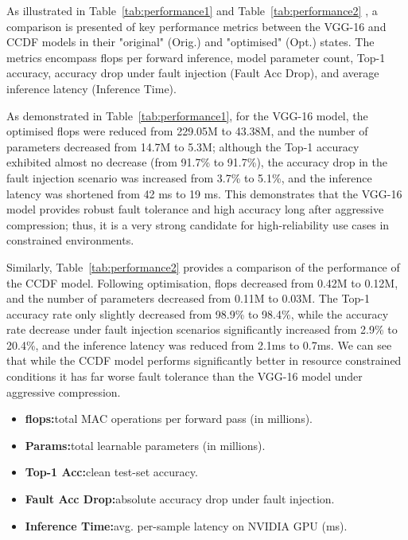     As illustrated in Table~\ref{tab:performance1} and Table~\ref{tab:performance2} , a comparison is presented of key performance metrics between the VGG-16 and CCDF models in their "original" (Orig.) and "optimised" (Opt.) states. The metrics encompass \gls{flops} per forward inference, model parameter count, Top-1 accuracy, accuracy drop under fault injection (Fault Acc Drop), and average inference latency (Inference Time).
    
    As demonstrated in Table~\ref{tab:performance1}, for the VGG-16 model, the optimised \gls{flops} were reduced from 229.05M to 43.38M, and the number of parameters decreased from 14.7M to 5.3M; although the Top-1 accuracy exhibited almost no decrease (from 91.7\% to 91.7\%), the accuracy drop in the fault injection scenario was increased from 3.7\% to 5.1\%, and the inference latency was shortened from 42 ms to 19 ms. This demonstrates that the VGG-16 model provides robust fault tolerance and high accuracy long after aggressive compression; thus, it is a very strong candidate for high-reliability use cases in constrained environments.
    
    Similarly, Table~\ref{tab:performance2} provides a comparison of the performance of the CCDF model. Following optimisation, \gls{flops} decreased from 0.42M to 0.12M, and the number of parameters decreased from 0.11M to 0.03M. The Top-1 accuracy rate only slightly decreased from 98.9\% to 98.4\%, while the accuracy rate decrease under fault injection scenarios significantly increased from 2.9\% to 20.4\%, and the inference latency was reduced from 2.1ms to 0.7ms. We can see that while the CCDF model performs significantly better in resource constrained conditions it has far worse fault tolerance than the VGG-16 model under aggressive compression.
    
    \begin{itemize}
        \item \textbf{\gls{flops}:}total MAC operations per forward pass (in millions).
        \item \textbf{Params:}total learnable parameters (in millions).
        \item \textbf{Top-1 Acc:}clean test-set accuracy.
        \item \textbf{Fault Acc Drop:}absolute accuracy drop under fault injection.
        \item \textbf{Inference Time:}avg. per-sample latency on NVIDIA GPU (ms).
    \end{itemize}


